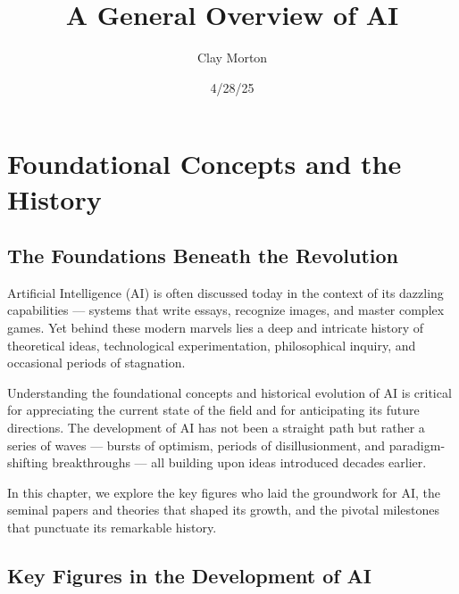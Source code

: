 \documentclass[openany]{book}
\title{A General Overview of AI}
\author{Clay Morton}
\date{4/28/25}
\begin{document}
\maketitle

\begingroup
\let\cleardoublepage\relax
\tableofcontents
\endgroup

\chapter{Foundational Concepts and the History}

\section{The Foundations Beneath the Revolution}

Artificial Intelligence (AI) is often discussed today in the context of its 
dazzling capabilities — systems that write essays, recognize images, and master 
complex games. Yet behind these modern marvels lies a deep and intricate history 
of theoretical ideas, technological experimentation, philosophical inquiry, and 
occasional periods of stagnation.

Understanding the foundational concepts and historical evolution of AI is 
critical for appreciating the current state of the field and for anticipating 
its future directions. The development of AI has not been a straight path but 
rather a series of waves — bursts of optimism, periods of disillusionment, and 
paradigm-shifting breakthroughs — all building upon ideas introduced decades 
earlier.

In this chapter, we explore the key figures who laid the groundwork for AI, the
seminal papers and theories that shaped its growth, and the pivotal milestones 
that punctuate its remarkable history.

\section{Key Figures in the Development of AI}
\end{document}
